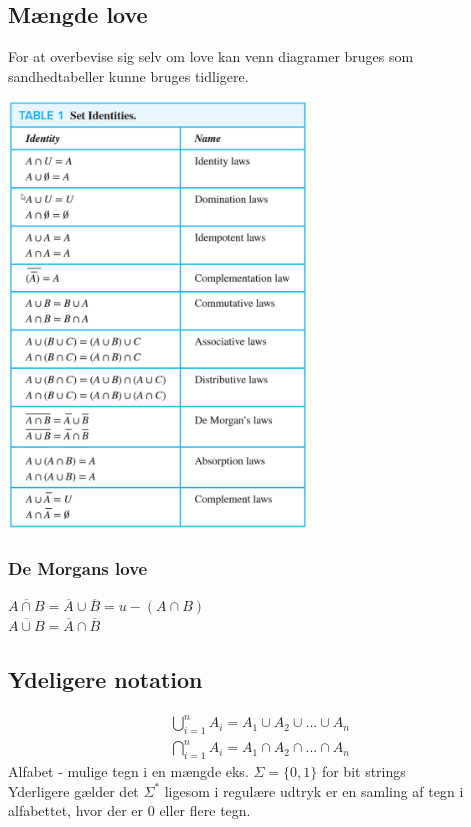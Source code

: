 \documentclass[12pt, a4paper]{article}
\begin{document}
			\subsection{Mængde love}
				For at overbevise sig selv om love kan venn diagramer bruges som sandhedtabeller kunne bruges tidligere.
				\begin{center}
					\includegraphics[width=300px]{assets/setEq.png}
				\end{center}
				\subsubsection{De Morgans love}
					$\overline{A\cap B} = \overline{A}\cup \overline{B}=u-(A\cap B)$\\
					$\overline{A\cup B} = \overline{A} \cap \overline{B}$\
			\subsection{Ydeligere notation}
				\begin{align*}
					\bigcup\limits_{i=1}^n A_i=A_1\cup A_2 \cup ... \cup A_n\\
					\bigcap\limits_{i=1}^n A_i=A_1\cap A_2 \cap ... \cap A_n
				\end{align*}
				Alfabet - mulige tegn i en mængde eks. $\Sigma = \{0,1\}$ for bit strings\\
				Yderligere gælder det $\Sigma^*$ ligesom i regulære udtryk er en samling af tegn i alfabettet, hvor der er 0 eller flere tegn.
\end{document}
